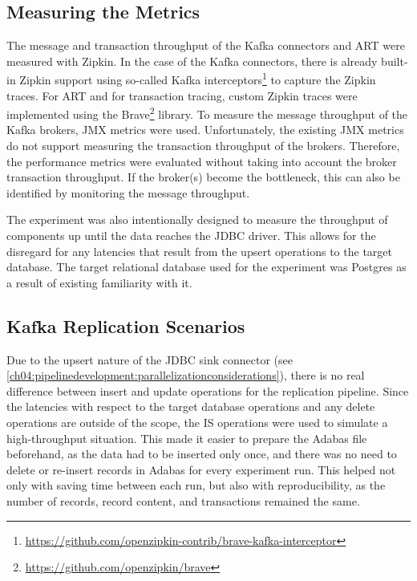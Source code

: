 \subsection{Measuring the Metrics}
The message and transaction throughput of the Kafka connectors and \ac{ART} were measured with Zipkin. In the case of the Kafka connectors, there is already built-in Zipkin support using so-called Kafka interceptors\footnote{\url{https://github.com/openzipkin-contrib/brave-kafka-interceptor}} to capture the Zipkin traces. For \ac{ART} and for transaction tracing, custom Zipkin traces were implemented using the Brave\footnote{\url{https://github.com/openzipkin/brave}} library. To measure the message throughput of the Kafka brokers, \ac{JMX} metrics were used. Unfortunately, the existing \ac{JMX} metrics do not support measuring the transaction throughput of the brokers. Therefore, the performance metrics were evaluated without taking into account the broker transaction throughput. If the broker(s) become the bottleneck, this can also be identified by monitoring the message throughput.


The experiment was also intentionally designed to measure the throughput of components up until the data reaches the \ac{JDBC} driver. This allows for the disregard for any latencies that result from the upsert operations to the target database. The target relational database used for the experiment was Postgres as a result of existing familiarity with it.

\subsection{Kafka Replication Scenarios}
\label{ch05:methodology:design:scenarios}
Due to the upsert nature of the \ac{JDBC} sink connector (see \ref{ch04:pipelinedevelopment:parallelizationconsiderations}), there is no real difference between insert and update operations for the replication pipeline. Since the latencies with respect to the target database operations and any delete operations are outside of the scope, the \ac{IS} operations were used to simulate a high-throughput situation. This made it easier to prepare the Adabas file beforehand, as the data had to be inserted only once, and there was no need to delete or re-insert records in Adabas for every experiment run. This helped not only with saving time between each run, but also with reproducibility, as the number of records, record content, and transactions remained the same.

